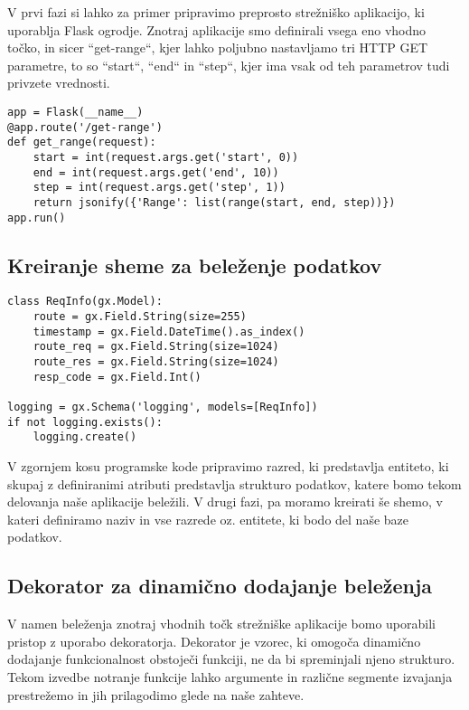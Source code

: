 \documentclass[a4paper,12pt,openright]{book}
\begin{document}
    V prvi fazi si lahko za primer pripravimo preprosto strežniško aplikacijo, ki uporablja Flask \cite{FLASK_GITHUB} ogrodje. Znotraj aplikacije smo definirali vsega eno vhodno točko, in sicer ``get-range``, kjer lahko poljubno nastavljamo tri HTTP GET parametre, to so ``start``, ``end`` in ``step``, kjer ima vsak od teh parametrov tudi privzete vrednosti.
    
\begin{verbatim}
app = Flask(__name__)
@app.route('/get-range')
def get_range(request):
    start = int(request.args.get('start', 0))
    end = int(request.args.get('end', 10))
    step = int(request.args.get('step', 1))
    return jsonify({'Range': list(range(start, end, step))})
app.run()
\end{verbatim}

    \subsection{Kreiranje sheme za beleženje podatkov}
\begin{verbatim}
class ReqInfo(gx.Model):
    route = gx.Field.String(size=255)
    timestamp = gx.Field.DateTime().as_index()
    route_req = gx.Field.String(size=1024)
    route_res = gx.Field.String(size=1024)
    resp_code = gx.Field.Int()

logging = gx.Schema('logging', models=[ReqInfo])
if not logging.exists():
    logging.create()
\end{verbatim}

    \noindent
    V zgornjem kosu programske kode pripravimo razred, ki predstavlja entiteto, ki skupaj z definiranimi atributi predstavlja strukturo podatkov, katere bomo tekom delovanja naše aplikacije beležili. V drugi fazi, pa moramo kreirati še shemo, v kateri definiramo naziv in vse razrede oz. entitete, ki bodo del naše baze podatkov.

    \subsection{Dekorator za dinamično dodajanje beleženja}

    V namen beleženja znotraj vhodnih točk strežniške aplikacije bomo uporabili pristop z uporabo dekoratorja.
    Dekorator je vzorec,  ki omogoča dinamično dodajanje funkcionalnost obstoječi funkciji, ne da bi spreminjali njeno strukturo. Tekom izvedbe notranje funkcije lahko argumente in različne segmente izvajanja prestrežemo in jih prilagodimo glede na naše zahteve.
    
\end{document}
